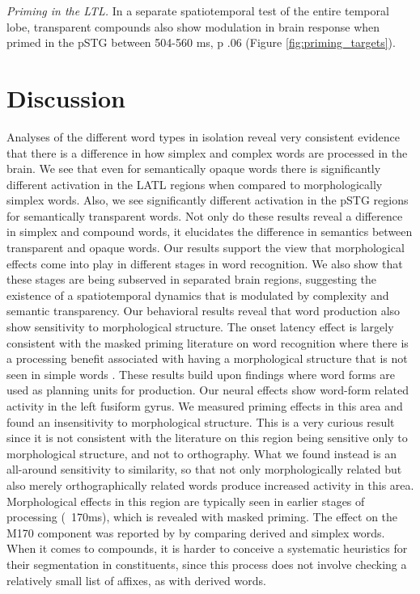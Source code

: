 \documentclass{frontiersSCNS}
\begin{document}
\textit{Priming in the LTL.} In a separate spatiotemporal test of the entire temporal lobe, transparent compounds also show modulation in brain response when primed in the pSTG between 504-560 ms, p \lessthan .06 (Figure \ref{fig:priming_targets}).  

\section{Discussion}
	Analyses of the different word types in isolation reveal very consistent evidence that there is a difference in how simplex and complex words are processed in the brain. We see that even for semantically opaque words there is significantly different activation in the LATL regions when compared to morphologically simplex words. Also, we see significantly different activation in the pSTG regions for semantically transparent words. Not only do these results reveal a difference in simplex and compound words, it elucidates the difference in semantics between transparent and opaque words. Our results support the view that morphological effects come into play in different stages in word recognition.  We also show that these stages are being subserved in separated brain regions, suggesting the existence of a spatiotemporal dynamics that is modulated by complexity and semantic transparency. 	
 Our behavioral results reveal that word production also show sensitivity to morphological structure.  The onset latency effect is largely consistent with the masked priming literature on word recognition where there is a processing benefit associated with having a morphological structure that is not seen in simple words \citep{Rastle:2004, Taft:2004, Morris:2007, McCormick:2008, Fiorentino:2009}. These results build upon \cite{Roelofs:2002} findings where word forms are used as planning units for production.  
Our neural effects show word-form related activity in the left fusiform gyrus.  We measured priming effects in this area and found an insensitivity to morphological structure. This is a very curious result since it is not consistent with the literature on this region being sensitive only to morphological structure, and not to orthography. What we found instead is an all-around sensitivity to similarity, so that not only morphologically related but also merely orthographically related words produce increased activity in this area.  Morphological effects in this region are typically seen in earlier stages of processing (~170ms), which is revealed with masked priming.   The effect on the M170 component was reported by \cite{Zweig:2009} by comparing derived and simplex words.  When it comes to compounds, it is harder to conceive a systematic heuristics for their segmentation in constituents, since this process does not involve checking a relatively small list of affixes, as with derived words.
\end{document}
